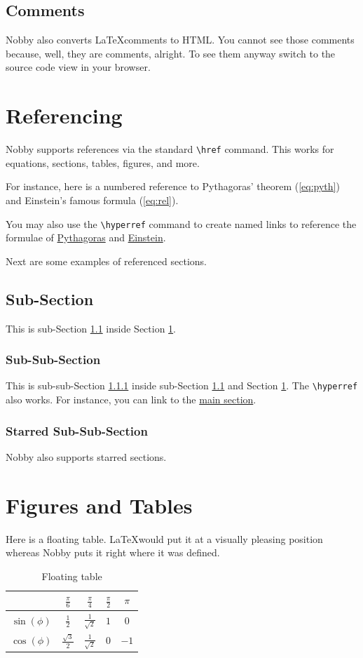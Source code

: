 \documentclass[10pt]{article}
\begin{document}
\subsection{Comments}
Nobby also converts \LaTeX comments to HTML. You cannot see those
comments because, well, they are comments, alright. To see them anyway
switch to the source code view in your browser.

\section{Referencing}
\label{sec:ref}
Nobby supports references via the standard \texttt{\textbackslash{href}}
command. This works for equations, sections, tables, figures, and
more.

For instance, here is a numbered reference to Pythagoras' theorem
(\ref{eq:pyth}) and Einstein's famous formula (\ref{eq:rel}).

You may also use the \texttt{\textbackslash{hyperref}} command to
create named links to reference the formulae of
\hyperref[eq:pyth]{Pythagoras} and \hyperref[eq:rel]{Einstein}.

Next are some examples of referenced sections.

\subsection{Sub-Section}
\label{ss:1}
This is sub-Section \ref{ss:1} inside Section \ref{sec:ref}.

\subsubsection{Sub-Sub-Section}
\label{sss:1}
This is sub-sub-Section \ref{sss:1} inside sub-Section \ref{ss:1} and
Section \ref{sec:ref}. The \texttt{\textbackslash{hyperref}} also
works. For instance, you can link to the \hyperref[sec:ref]{main section}.

\subsubsection*{Starred Sub-Sub-Section}
Nobby also supports starred sections.

\section{Figures and Tables}
Here is a floating table. \LaTeX would put it at a visually
pleasing position whereas Nobby puts it right where it was defined.
\begin{table}
  \centering
  \begin{tabular}{c | c c c c}
    & $\frac{\pi}{6}$& $\frac{\pi}{4}$& $\frac{\pi}{2}$ & $\pi$\\[1mm]
    \hline
    \rule{0cm}{4mm}$\sin(\phi)$& $\frac{1}{2}$ & $\frac{1}{\sqrt{2}}$& $1$ & $0$\\
    \rule{0cm}{4mm}$\cos(\phi)$& $\frac{\sqrt{3}}{2}$ & $\frac{1}{\sqrt{2}}$& $0$&$-1$
  \end{tabular}
  \caption{Floating table}
\end{table}
\\
\end{document}
